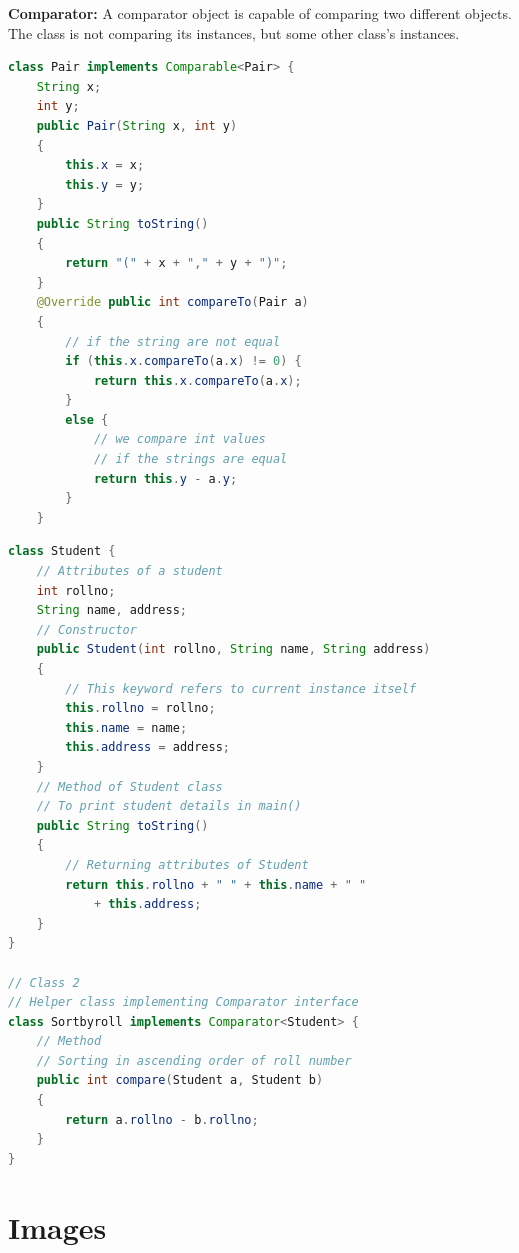 \documentclass{article}
\begin{document}
\textbf{Comparator:}
A comparator object is capable of comparing two different objects. The class is not comparing its instances, but some other class’s instances.

\begin{lstlisting}[language=java]
  class Pair implements Comparable<Pair> {
    String x;
    int y;
    public Pair(String x, int y)
    {
        this.x = x;
        this.y = y;
    }
    public String toString()
    {
        return "(" + x + "," + y + ")";
    }
    @Override public int compareTo(Pair a)
    {
        // if the string are not equal
        if (this.x.compareTo(a.x) != 0) {
            return this.x.compareTo(a.x);
        }
        else {
            // we compare int values
            // if the strings are equal
            return this.y - a.y;
        }
    }
\end{lstlisting}

\begin{lstlisting}[language=java]
  class Student {
    // Attributes of a student
    int rollno;
    String name, address;
    // Constructor
    public Student(int rollno, String name, String address)
    {
        // This keyword refers to current instance itself
        this.rollno = rollno;
        this.name = name;
        this.address = address;
    }
    // Method of Student class
    // To print student details in main()
    public String toString()
    {
        // Returning attributes of Student
        return this.rollno + " " + this.name + " "
            + this.address;
    }
}

// Class 2
// Helper class implementing Comparator interface
class Sortbyroll implements Comparator<Student> {
    // Method
    // Sorting in ascending order of roll number
    public int compare(Student a, Student b)
    {
        return a.rollno - b.rollno;
    }
}
\end{lstlisting}


\newpage

\section{Images}
\end{document}
